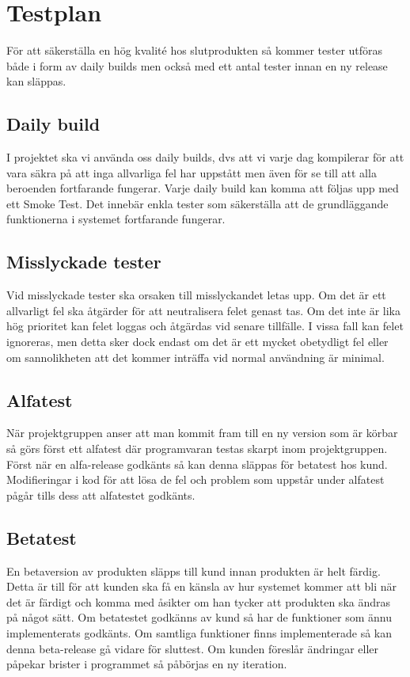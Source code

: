 \section{Testplan}
För att säkerställa en hög kvalité hos slutprodukten så kommer tester utföras både i form av daily builds men också med ett antal tester innan en ny release kan släppas.

\subsection{Daily build}
I projektet ska vi använda oss daily builds, dvs att vi varje dag kompilerar för att vara säkra på att inga allvarliga fel har uppstått men även för se till att alla beroenden fortfarande fungerar. Varje daily build kan komma att följas upp med ett Smoke Test. Det innebär enkla tester som säkerställa att de grundläggande funktionerna i systemet fortfarande fungerar. 

\subsection{Misslyckade tester}
Vid misslyckade tester ska orsaken till misslyckandet letas upp. Om det är ett allvarligt fel ska åtgärder för att neutralisera felet genast tas. Om det inte är lika hög prioritet kan felet loggas och åtgärdas vid senare tillfälle. I vissa fall kan felet ignoreras, men detta sker dock endast om det är ett mycket obetydligt fel eller om sannolikheten att det kommer inträffa vid normal användning är minimal.

\subsection{Alfatest}
När projektgruppen anser att man kommit fram till en ny version som är körbar så görs först ett alfatest där programvaran testas skarpt inom projektgruppen. Först när en alfa-release godkänts så kan denna släppas för betatest hos kund. Modifieringar i kod för att lösa de fel och problem som uppstår under alfatest pågår tills dess att alfatestet godkänts.

\subsection{Betatest}
En betaversion av produkten släpps till kund innan produkten är helt färdig. Detta är till för att kunden ska få en känsla av hur systemet kommer att bli när det är färdigt och komma med åsikter om han tycker att produkten ska ändras på något sätt. Om betatestet godkänns av kund så har de funktioner som ännu implementerats godkänts. Om samtliga funktioner finns implementerade så kan denna beta-release gå vidare för sluttest. Om kunden föreslår ändringar eller påpekar brister i programmet så påbörjas en ny iteration.

